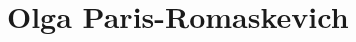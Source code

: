 \documentclass[11pt]{article}
\theoremstyle{definition}
\begin{document}
  



  


\section*{Olga Paris-Romaskevich}
\end{document}

